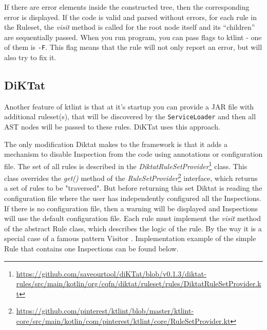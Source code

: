 If there are error elements inside the constructed tree, then the corresponding error is displayed. If the code is valid and parsed without errors, for each rule in the Ruleset, the \textsl{visit} method is called for the root node itself and its “children” are sequentially passed.
When you run program, you can pass flags to ktlint - one of them is \texttt{-F}. This flag means that the rule will not only report an error, but will also try to fix it.

\subsection{DiKTat}

Another feature of ktlint is that at it's startup you can provide a JAR file with additional ruleset(s), that will be discovered by the \texttt{ServiceLoader} and then all AST nodes will be passed to these rules. DiKTat uses this approach.

The only modification Diktat makes to the framework is that it adds a mechanism to disable Inspection from the code using annotations or configuration file. The set of all rules is described in the \textsl{DiktatRuleSetProvider}\footnote{\url{https://github.com/saveourtool/diKTat/blob/v0.1.3/diktat-rules/src/main/kotlin/org/cqfn/diktat/ruleset/rules/DiktatRuleSetProvider.kt}} class. This class overrides the \textsl{get()} method of the \textsl{RuleSetProvider}\footnote{\url{https://github.com/pinterest/ktlint/blob/master/ktlint-core/src/main/kotlin/com/pinterest/ktlint/core/RuleSetProvider.kt}} interface, which returns a set of rules to be "traversed". But before returning this set Diktat is reading the configuration file where the user has independently configured all the Inspections. If there is no configuration file, then a warning will be displayed and Inspections will use the default configuration file.
Each rule must implement the \textsl{visit} method of the abstract Rule class, which describes the logic of the rule. By the way it is a special case of a famous pattern Visitor \cite{ref:gang}. Implementation example of the simple Rule that contains one Inspections can be found below.

